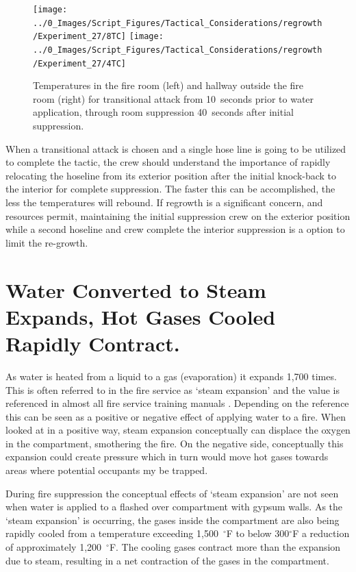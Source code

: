 \documentclass[12pt,oneside]{book}
\begin{document}
\begin{figure}[H]
\centering
\texttt{[image: ../0\_Images/Script\_Figures/Tactical\_Considerations/regrowth/Experiment\_27/8TC]}
\texttt{[image: ../0\_Images/Script\_Figures/Tactical\_Considerations/regrowth/Experiment\_27/4TC]}
\caption[Exterior Suppression Regrowth Temperatures]{Temperatures in the fire room (left) and hallway outside the fire room (right) for transitional attack from 10~seconds prior to water application, through room suppression 40~seconds after initial suppression.}
\label{fig:regrowth_TC_temps}
\end{figure}

When a transitional attack is chosen and a single hose line is going to be utilized to complete the tactic, the crew should understand the importance of rapidly relocating the hoseline from its exterior position after the initial knock-back to the interior for complete suppression. The faster this can be accomplished, the less the temperatures will rebound. If regrowth is a significant concern, and resources permit, maintaining the initial suppression crew on the exterior position while a second hoseline and crew complete the interior suppression is a option to limit the re-growth. 

\section{Water Converted to Steam Expands, Hot Gases Cooled Rapidly Contract.} \label{tc:steam_expansion}
As water is heated from a liquid to a gas (evaporation) it expands 1,700 times. This is often referred to in the fire service as `steam expansion' and the value is referenced in almost all fire service training manuals \cite{Corbett_FE_FFI_FFII} \cite{Stowell_Essentials6}. Depending on the reference this can be seen as a positive or negative effect of applying water to a fire. When looked at in a positive way, steam expansion conceptually can displace the oxygen in the compartment, smothering the fire. On the negative side,  conceptually this expansion could create pressure which in turn would move hot gases towards areas where potential occupants my be trapped. 

During fire suppression the conceptual effects of `steam expansion' are not seen when water is applied to a flashed over compartment with gypsum walls. As the `steam expansion' is occurring, the gases inside the compartment are also being rapidly cooled from a temperature exceeding 1,500~$^\circ$F to below 300$^\circ$F a reduction of approximately 1,200~$^\circ$F. The cooling gases contract more than the expansion due to steam, resulting in a net contraction of the gases in the compartment. 
\end{document}
